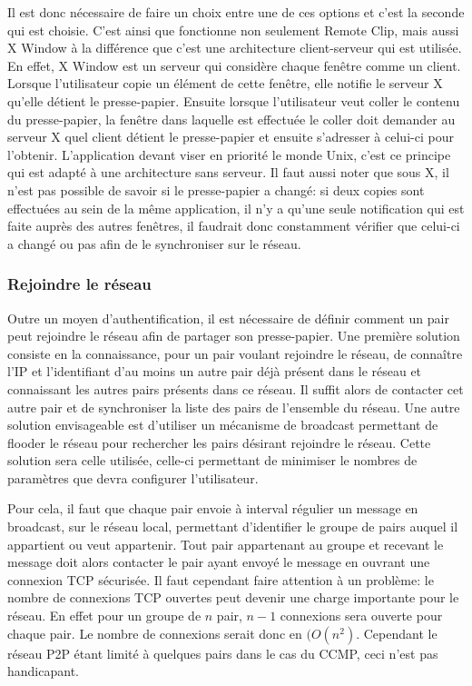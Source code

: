 Il est donc nécessaire de faire un choix entre une de ces options
et c'est la seconde qui est choisie. C'est ainsi que fonctionne non seulement
Remote Clip, mais aussi X Window\cite{nye1992xlib} à la différence
que c'est une architecture client-serveur qui est utilisée. En effet, X Window
est un serveur qui considère chaque fenêtre comme un client. Lorsque
l'utilisateur copie un élément de cette fenêtre, elle notifie le serveur X
qu'elle détient le presse-papier. Ensuite lorsque l'utilisateur
veut coller le contenu du presse-papier, la fenêtre dans laquelle est
effectuée le coller doit demander au serveur X quel client détient le
presse-papier et ensuite s'adresser à celui-ci pour l'obtenir. L'application
devant viser en priorité le monde Unix, c'est ce principe qui est adapté à
une architecture sans serveur. Il faut aussi noter que sous X, il n'est pas
possible de savoir si le presse-papier a changé: si deux copies sont
effectuées au sein de la même application, il n'y a qu'une seule notification
qui est faite auprès des autres fenêtres, il faudrait donc constamment
vérifier que celui-ci a changé ou pas afin de le synchroniser sur le
réseau.

\subsubsection*{Rejoindre le réseau}
Outre un moyen d'authentification, il est nécessaire de définir comment
un pair peut rejoindre le réseau afin de partager son presse-papier.
Une première solution consiste en la connaissance, pour un pair voulant
rejoindre le réseau, de connaître l'IP et l'identifiant d'au moins un autre
pair déjà présent dans le réseau et connaissant les autres pairs présents
dans ce réseau. Il suffit alors de contacter cet autre pair et de synchroniser
la  liste des pairs de l'ensemble du réseau. Une autre solution envisageable
est d'utiliser un mécanisme de broadcast permettant de flooder le réseau pour
rechercher les pairs désirant rejoindre le réseau. Cette solution sera celle
utilisée, celle-ci permettant de minimiser le nombres de paramètres que devra
configurer l'utilisateur.

Pour cela, il faut que chaque pair envoie à interval régulier un message
en broadcast, sur le réseau local, permettant d'identifier le groupe de pairs
auquel il appartient ou veut appartenir. Tout pair appartenant au groupe et
recevant le message doit alors contacter le pair ayant envoyé le message en
ouvrant une connexion TCP sécurisée. Il faut cependant faire attention à un
problème: le nombre de connexions TCP ouvertes peut devenir une charge
importante pour le réseau. En effet pour un groupe de $n$ pair, $n-1$
connexions sera ouverte pour chaque pair. Le nombre de connexions serait donc
en $(O(n^2)$. Cependant le réseau P2P étant limité à quelques pairs dans le
cas du CCMP, ceci n'est pas handicapant.

